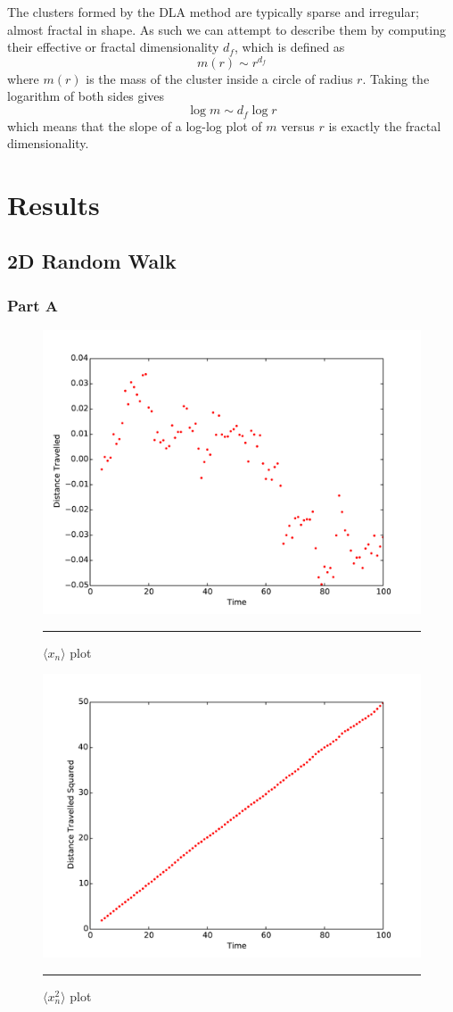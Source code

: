 \documentclass[notitlepage,aps,prd,nofootinbib]{revtex4-1}
\begin{document}
The clusters formed by the DLA method are typically sparse and irregular; almost fractal in shape. As such we can attempt to describe them by computing their effective or fractal dimensionality $d_f$, which is defined as
\begin{equation}
m(r)\sim r^{d_f}
\end{equation}
where $m(r)$ is the mass of the cluster inside a circle of radius $r$. Taking the logarithm of both sides gives
\begin{equation}
\log m \sim d_f \log r
\end{equation}
which means that the slope of a log-log plot of $m$ versus $r$ is exactly the fractal dimensionality.

\clearpage
\section{Results}
\label{sec:results}
\subsection{2D Random Walk}
\subsubsection{Part A}
\begin{figure}[!htbc]
  \centering
  \includegraphics[width=.6\textwidth]{../output/plots_for_paper/problem_1/xn_Plot.pdf}
  	{\par\nobreak\rule[9pt]{35em}{0.5pt}\vspace{-5mm}}
	\caption{$\langle x_{n} \rangle$ plot}
	\label{fig:1_a_1}
  \includegraphics[width=.6\textwidth]{../output/plots_for_paper/problem_1/xn2_Plot.pdf}
  	{\par\nobreak\rule[9pt]{35em}{0.5pt}\vspace{-5mm}}
	\caption{$\langle x_{n}^{2} \rangle$ plot}
	\label{fig:1_a_2}
\end{figure}
\end{document}
